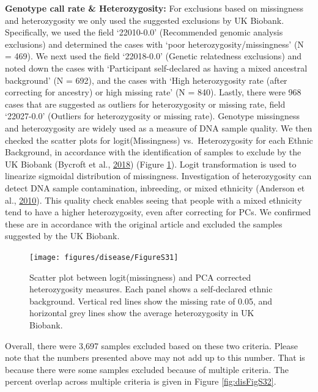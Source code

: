 \documentclass[12pt,twoside]{unicam}
\begin{document}
\textbf{Genotype call rate \& Heterozygosity:} For exclusions based on missingness and heterozygosity we only used the suggested exclusions by UK Biobank. Specifically, we used the field `22010-0.0' (Recommended genomic analysis exclusions) and determined the cases with `poor heterozygosity/missingness' (N = 469). We next used the field `22018-0.0' (Genetic relatedness exclusions) and noted down the cases with `Participant self-declared as having a mixed ancestral background' (N = 692), and the cases with `High heterozygosity rate (after correcting for ancestry) or high missing rate' (N = 840). Lastly, there were 968 cases that are suggested as outliers for heterozygosity or missing rate, field `22027-0.0' (Outliers for heterozygosity or missing rate). Genotype missingness and heterozygosity are widely used as a measure of DNA sample quality. We then checked the scatter plots for logit(Missingness) vs.~Heterozygosity for each Ethnic Background, in accordance with the identification of samples to exclude by the UK Biobank (Bycroft et al., \protect\hyperlink{ref-Bycroft2018}{2018}) (Figure \ref{fig:disFigS31}). Logit transformation is used to linearize sigmoidal distribution of missingness. Investigation of heterozygosity can detect DNA sample contamination, inbreeding, or mixed ethnicity (Anderson et al., \protect\hyperlink{ref-Anderson2010}{2010}). This quality check enables seeing that people with a mixed ethnicity tend to have a higher heterozygosity, even after correcting for PCs. We confirmed these are in accordance with the original article and excluded the samples suggested by the UK Biobank.

\begin{figure}

{\centering \texttt{[image: figures/disease/FigureS31]} 

}

\caption[Scatter plot between logit(missingness) and PCA corrected heterozygosity measures.]{Scatter plot between logit(missingness) and PCA corrected heterozygosity measures. Each panel shows a self-declared ethnic background. Vertical red lines show the missing rate of 0.05, and horizontal grey lines show the average heterozygosity in UK Biobank.}\label{fig:disFigS31}
\end{figure}

Overall, there were 3,697 samples excluded based on these two criteria. Please note that the numbers presented above may not add up to this number. That is because there were some samples excluded because of multiple criteria. The percent overlap across multiple criteria is given in Figure \ref{fig:disFigS32}.
\end{document}
